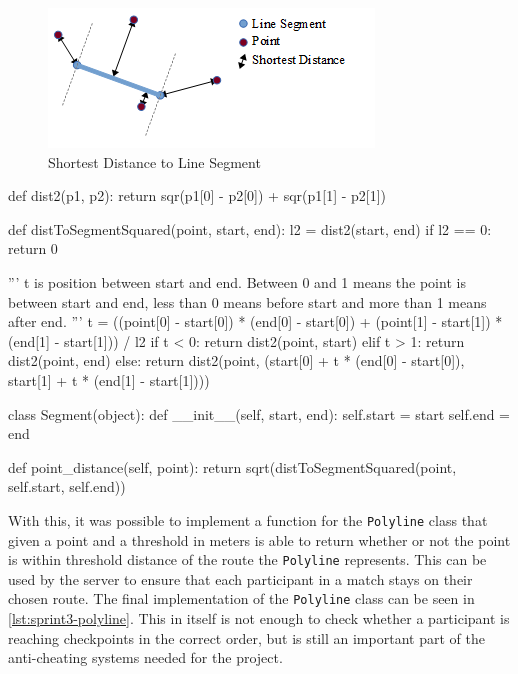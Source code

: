 \begin{figure}[!ht]
	\centering
	\includegraphics[scale=0.85]{img/sprint3linesegment.png}
	\caption{Shortest Distance to Line Segment}
	\label{fig:sprint3-linesegment}
\end{figure}

\begin{code}[label={lst:sprint3-dist}, caption={Distance Between Point and Line Segment}, language={Python}, style={PythonDoc}]
def dist2(p1, p2):
	return sqr(p1[0] - p2[0]) + sqr(p1[1] - p2[1])

def distToSegmentSquared(point, start, end):
	l2 = dist2(start, end)
	if l2 == 0:
		return 0

	'''
	t is position between start and end.
	Between 0 and 1 means the point is between start and end,
	less than 0 means before start and more than 1 means after end.
	'''
	t = ((point[0] - start[0]) * (end[0] - start[0]) + 
	     (point[1] - start[1]) * (end[1] - start[1])) / l2
	if t < 0:
		return dist2(point, start)
	elif t > 1:
		return dist2(point, end)
	else:
		return dist2(point, (start[0] + t * (end[0] - start[0]),
		                     start[1] + t * (end[1] - start[1])))

class Segment(object):
	def __init__(self, start, end):
		self.start = start
		self.end = end

	def point_distance(self, point):
		return sqrt(distToSegmentSquared(point, self.start, self.end))
\end{code}

With this, it was possible to implement a function for the \texttt{Polyline} class that given a point and a threshold in meters is able to return whether or not the point is within threshold distance of the route the \texttt{Polyline} represents. This can be used by the server to ensure that each participant in a match stays on their chosen route. The final implementation of the \texttt{Polyline} class can be seen in \autoref{lst:sprint3-polyline}. This in itself is not enough to check whether a participant is reaching checkpoints in the correct order, but is still an important part of the anti-cheating systems needed for the project.

